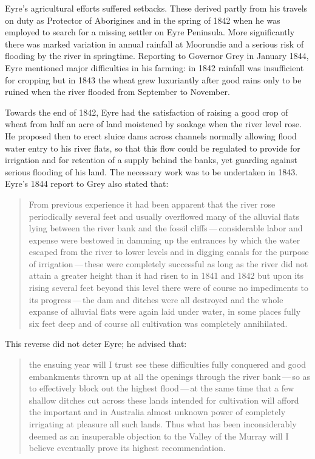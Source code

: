 Eyre's agricultural efforts suffered setbacks.  These derived partly
from his travels on duty as Protector of Aborigines and in the spring
of 1842 when he was employed to search for a missing settler on Eyre
Peninsula.  More significantly there was marked
variation in annual rainfall at Moorundie and a serious risk of
flooding by the river in springtime.  Reporting to Governor Grey in
January 1844, Eyre mentioned major difficulties in his farming: in
1842 rainfall was insufficient for cropping but in 1843 the wheat grew
luxuriantly after good rains only to be ruined when the river flooded
from September to Nov\-ember.

Towards the end of 1842, Eyre had the satisfaction of raising a good
crop of wheat from half an acre of land moistened by soakage when the
river level rose.  He proposed then to erect sluice dams across
channels normally allowing flood water entry to his river flats, so
that this flow could be regulated to provide for irrigation and for
retention of a supply behind the banks, yet guarding against serious
flooding of his land.  The
necessary work was to be undertaken in 1843.  Eyre's 1844 report to
Grey also stated that:
\begin{quote}
	From previous experience it had been apparent that the river
	rose periodically several feet and usually overflowed many of
	the alluvial flats lying between the river bank and the fossil
	cliffs\,---\,considerable labor and expense were bestowed in
	damming up the entrances by which the water escaped from the
	river to lower levels and in digging canals for the purpose of
	irrigation\,---\,these were completely successful as long as the
	river did not attain a greater height than it had risen to in
	1841 and 1842 but upon its rising several feet beyond this
	level there were of course no impediments to its
	progress\,---\,the dam and ditches were all destroyed and the
	whole expanse of alluvial flats were again laid under water,
	in some places fully six feet deep and of course all
	cultivation was completely annihilated.
\end{quote}

This reverse did not deter Eyre; he advised that:
\begin{quote}
	the ensuing year will I trust see these difficulties fully
        conquered and good embankments thrown up at all the openings
        through the river bank\,---\,so as to effectively block out the
        highest flood\,---\,at the same time that a few shallow ditches
        cut across these lands intended for cultivation will afford
        the important and in Australia almost unknown power of
        completely irrigating at pleasure all such lands. Thus what
        has been inconsiderably deemed as an insuperable objection to
        the Valley of the Murray will I believe eventually prove its
        highest recommend\-ation.
\end{quote}

